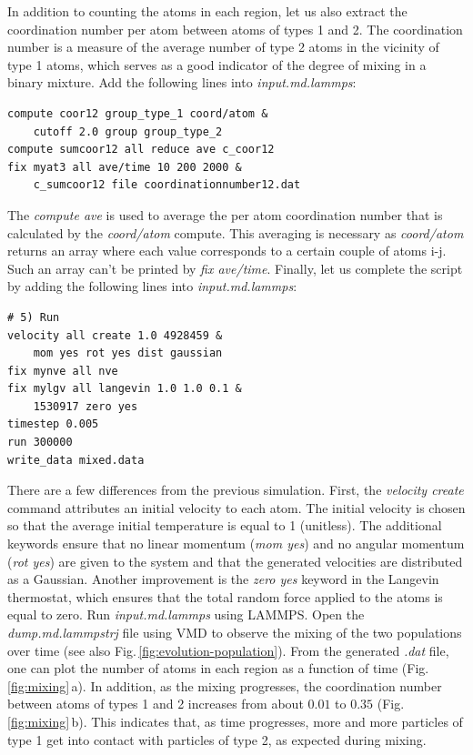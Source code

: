 \documentclass[9pt,tutorial]{livecoms}
\begin{document}
In addition to counting the atoms in each region, let us also extract the coordination number per atom between atoms of types 1 and 2. The coordination number is a measure of the average number of type 2 atoms in the vicinity of type 1 atoms, which serves as a good indicator of the degree of mixing in a binary mixture. Add the following lines into \textit{input.md.lammps}:
{\normalsize \begin{verbatim}
compute coor12 group_type_1 coord/atom &
    cutoff 2.0 group group_type_2
compute sumcoor12 all reduce ave c_coor12
fix myat3 all ave/time 10 200 2000 &
    c_sumcoor12 file coordinationnumber12.dat
\end{verbatim}}
The \textit{compute ave} is used to average the per atom coordination number that is calculated by the \textit{coord/atom} compute. This averaging is necessary as \textit{coord/atom} returns an array where each value corresponds to a certain couple of atoms i-j. Such an array can't be printed by \textit{fix ave/time}. Finally, let us complete the script by adding the following lines into \textit{input.md.lammps}:
{\normalsize \begin{verbatim}
# 5) Run
velocity all create 1.0 4928459 &
    mom yes rot yes dist gaussian
fix mynve all nve
fix mylgv all langevin 1.0 1.0 0.1 &
    1530917 zero yes
timestep 0.005
run 300000
write_data mixed.data
\end{verbatim}}
There are a few differences from the previous simulation. First, the \textit{velocity create} command attributes an initial velocity to each atom. The initial velocity is chosen so that the average initial temperature is equal to 1 (unitless). The additional keywords ensure that no linear momentum (\textit{mom yes}) and no angular momentum (\textit{rot yes}) are given to the system and that the generated velocities are distributed as a Gaussian. Another improvement is the \textit{zero yes} keyword in the Langevin thermostat, which ensures that the total random force applied to the atoms is equal to zero. Run \textit{input.md.lammps} using LAMMPS. Open the \textit{dump.md.lammpstrj} file using VMD to observe the mixing of the two populations over time (see also Fig.\,\ref{fig:evolution-population}). From the generated \textit{.dat} file, one can plot the number of atoms in each region as a function of time (Fig.\,\ref{fig:mixing}\,a). In addition, as the mixing progresses, the coordination number between atoms of types 1 and 2 increases from about $0.01$ to $0.35$ (Fig.\,\ref{fig:mixing}\,b). This indicates that, as time progresses, more and more particles of type 1 get into contact with particles of type 2, as expected during mixing.
\end{document}
